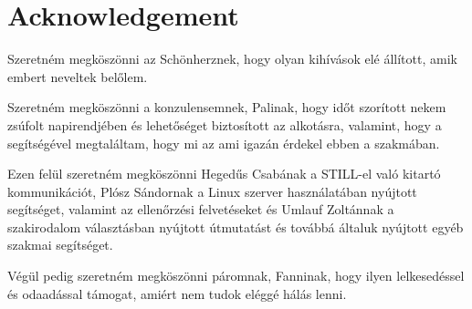 \chapter*{Acknowledgement}

Szeretn\'{e}m megk\"{o}sz\"{o}nni az Sch\"{o}nherznek, hogy olyan kih\'{i}v\'{a}sok el\'{e} \'{a}ll\'{i}tott, amik embert neveltek bel\H{o}lem.

Szeretn\'{e}m megk\"{o}sz\"{o}nni a konzulensemnek, Palinak, hogy id\H{o}t szor\'{i}tott nekem zs\'{u}folt napirendj\'{e}ben \'{e}s lehet\H{o}s\'{e}get biztos\'{i}tott az alkot\'{a}sra, valamint, hogy a seg\'{i}ts\'{e}g\'{e}vel megtal\'{a}ltam, hogy mi az ami igaz\'{a}n \'{e}rdekel ebben a szakm\'{a}ban.

Ezen fel\"{u}l szeretn\'{e}m megk\"{o}sz\"{o}nni Heged\H{u}s Csab\'{a}nak a STILL-el val\'{o} kitart\'{o} kommunik\'{a}ci\'{o}t, Pl\'{o}sz S\'{a}ndornak a Linux szerver haszn\'{a}lat\'{a}ban ny\'{u}jtott seg\'{i}ts\'{e}get, valamint az ellen\H{o}rz\'{e}si felvet\'{e}seket \'{e}s Umlauf Zolt\'{a}nnak a szakirodalom v\'{a}laszt\'{a}sban ny\'{u}jtott \'{u}tmutat\'{a}st \'{e}s tov\'{a}bb\'{a} \'{a}ltaluk ny\'{u}jtott egy\'{e}b szakmai seg\'{i}ts\'{e}get.

V\'{e}g\"{u}l pedig szeretn\'{e}m megk\"{o}sz\"{o}nni p\'{a}romnak, Fanninak, hogy ilyen lelkesed\'{e}ssel \'{e}s odaad\'{a}ssal t\'{a}mogat, ami\'{e}rt nem tudok el\'{e}gg\'{e} h\'{a}l\'{a}s lenni.